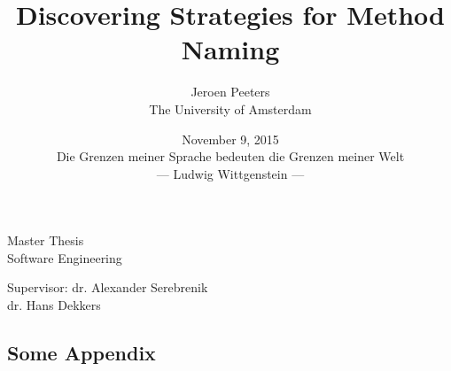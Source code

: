 \documentclass{article}%
\begin{document}
\title{Discovering Strategies for Method Naming}
\author{Jeroen Peeters
\\The University of Amsterdam}
\date{November 9, 2015 \\\vspace*{12.5cm}\small{Die Grenzen meiner Sprache bedeuten die Grenzen meiner Welt\\--- Ludwig Wittgenstein ---}} %
\maketitle
\thispagestyle{empty}
\newpage

\begin{center}
Master Thesis \\
Software Engineering \\
\vspace{1cm}

\vspace{1cm}
Supervisor: dr. Alexander Serebrenik\\
\hspace{7 mm}dr. Hans Dekkers\\
\end{center}
\thispagestyle{empty}
\newpage


\renewcommand{\contentsname}{ \begin{center} --- Table of Contents --- \end{center}}
\setcounter{tocdepth}{1}
\tableofcontents
{}
\newpage







\newpage
{}



\begin{appendices}
\chapter{Some Appendix}



\end{appendices}
\end{document}
